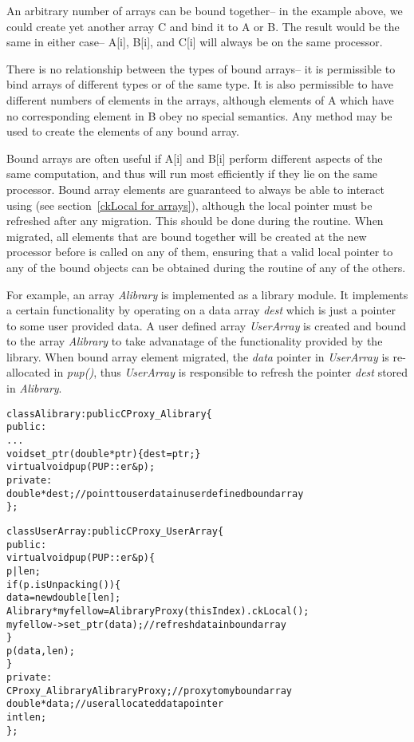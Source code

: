 An arbitrary number of arrays can be bound together--
in the example above, we could create yet another array
C and bind it to A or B.  The result would be the same
in either case-- A[i], B[i], and C[i] will always be
on the same processor.

There is no relationship between the types of bound arrays--
it is permissible to bind arrays of different types or of the
same type.  It is also permissible to have different numbers
of elements in the arrays, although elements of A which have
no corresponding element in B obey no special semantics.
Any method may be used to create the elements of any bound
array.

Bound arrays are often useful if A[i] and B[i] perform different 
aspects of the same computation, and thus will run most efficiently 
if they lie on the same processor.  Bound array elements are guaranteed
to always be able to interact using  (see 
section~\ref{ckLocal for arrays}), although the local pointer must
be refreshed after any migration. This should be done during the 
routine. When migrated, all elements that are bound together will be created
at the new processor before  is called on any of them, ensuring that
a valid local pointer to any of the bound objects can be obtained during the
 routine of any of the others.

For example, an array {\it Alibrary} is implemented as a library module.
It implements a certain functionality by operating on a data array {\it dest}
which is just a pointer to some user provided data.
A user defined array {\it UserArray} is created and bound to 
the array {\it Alibrary} to take advanatage of the functionality provided 
by the library.
When bound array element migrated, the {\it data} pointer in {\it UserArray}
is re-allocated in {\it pup()}, thus {\it UserArray} is responsible to refresh
the pointer {\it dest} stored in {\it Alibrary}.

\begin{alltt}
class Alibrary: public CProxy_Alibrary \{
public:
  ...
  void set_ptr(double *ptr) \{ dest = ptr; \}
  virtual void pup(PUP::er &p);
private:
  double *dest;           // point to user data in user defined bound array
\};

class UserArray: public CProxy_UserArray \{
public:
  virtual void pup(PUP::er &p) \{
                p|len;
                if(p.isUnpacking()) \{ 
                  data = new double[len];
                  Alibrary *myfellow = AlibraryProxy(thisIndex).ckLocal();
                  myfellow->set_ptr(data);    // refresh data in bound array
                \}
                p(data, len);
  \}
private:
  CProxy_Alibrary  AlibraryProxy;   // proxy to my bound array
  double *data;          // user allocated data pointer
  int len;
\};
\end{alltt}


